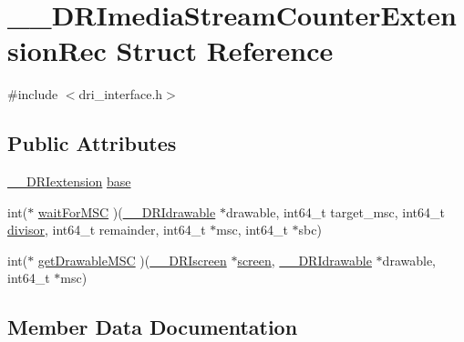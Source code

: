 \hypertarget{struct_____d_r_imedia_stream_counter_extension_rec}{}\section{\+\_\+\+\_\+\+D\+R\+Imedia\+Stream\+Counter\+Extension\+Rec Struct Reference}
\label{struct_____d_r_imedia_stream_counter_extension_rec}


{\ttfamily \#include $<$dri\+\_\+interface.\+h$>$}

\subsection*{Public Attributes}
\begin{DoxyCompactItemize}
\item 
\hyperlink{dri__interface_8h_a4e0a61c8ece00d2b2c6792a9a1b55385}{\+\_\+\+\_\+\+D\+R\+Iextension} \hyperlink{struct_____d_r_imedia_stream_counter_extension_rec_a042c5ddf263000434a369b5da09efacc}{base}
\item 
int($\ast$ \hyperlink{struct_____d_r_imedia_stream_counter_extension_rec_a107fccbb1b65855b80ad77bf18cc1f8e}{wait\+For\+M\+SC} )(\hyperlink{dri__interface_8h_a5bfb832a0a08208d95b3bbef439d2262}{\+\_\+\+\_\+\+D\+R\+Idrawable} $\ast$drawable, int64\+\_\+t target\+\_\+msc, int64\+\_\+t \hyperlink{glcorearb_8h_a8663d897b5393d6facc1df40530f841d}{divisor}, int64\+\_\+t remainder, int64\+\_\+t $\ast$msc, int64\+\_\+t $\ast$sbc)
\item 
int($\ast$ \hyperlink{struct_____d_r_imedia_stream_counter_extension_rec_a82d7d1aecc55e2ac74d30b5b14acce95}{get\+Drawable\+M\+SC} )(\hyperlink{dri__interface_8h_a9961b01d421ee1fd6ed3c05acc9ca561}{\+\_\+\+\_\+\+D\+R\+Iscreen} $\ast$\hyperlink{cad_8h_ae04e09e4e3831bfc1632c509ae37dcec}{screen}, \hyperlink{dri__interface_8h_a5bfb832a0a08208d95b3bbef439d2262}{\+\_\+\+\_\+\+D\+R\+Idrawable} $\ast$drawable, int64\+\_\+t $\ast$msc)
\end{DoxyCompactItemize}


\subsection{Member Data Documentation}
\mbox{\label{struct_____d_r_imedia_stream_counter_extension_rec_a042c5ddf263000434a369b5da09efacc}} 
